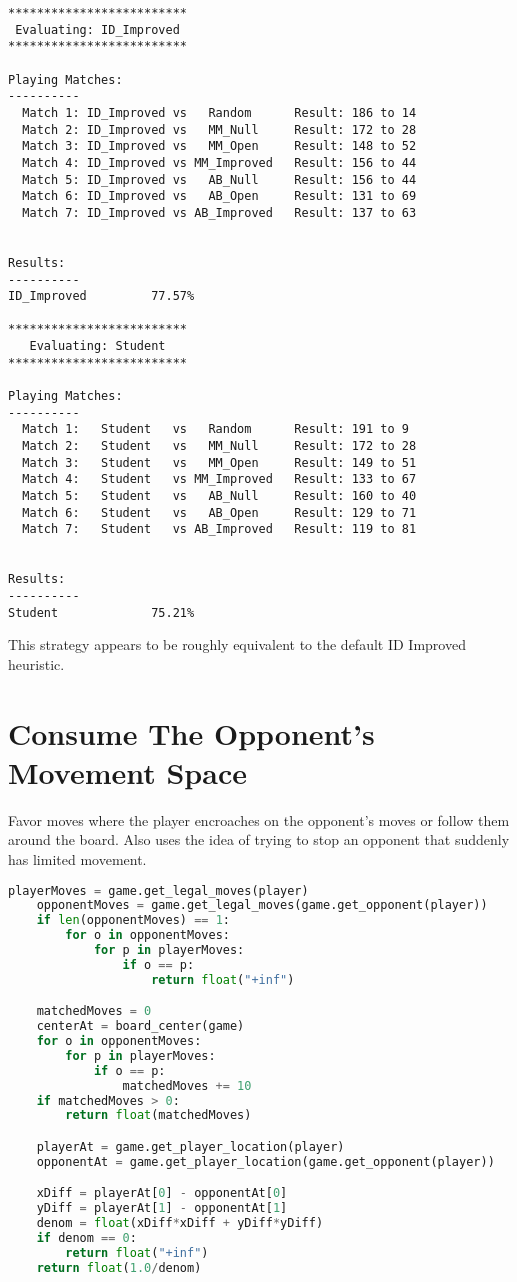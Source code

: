\documentclass[10pt, a4paper]{article}
\begin{document}
\begin{verbatim}
*************************
 Evaluating: ID_Improved 
*************************

Playing Matches:
----------
  Match 1: ID_Improved vs   Random    	Result: 186 to 14
  Match 2: ID_Improved vs   MM_Null   	Result: 172 to 28
  Match 3: ID_Improved vs   MM_Open   	Result: 148 to 52
  Match 4: ID_Improved vs MM_Improved 	Result: 156 to 44
  Match 5: ID_Improved vs   AB_Null   	Result: 156 to 44
  Match 6: ID_Improved vs   AB_Open   	Result: 131 to 69
  Match 7: ID_Improved vs AB_Improved 	Result: 137 to 63


Results:
----------
ID_Improved         77.57%

*************************
   Evaluating: Student   
*************************

Playing Matches:
----------
  Match 1:   Student   vs   Random    	Result: 191 to 9
  Match 2:   Student   vs   MM_Null   	Result: 172 to 28
  Match 3:   Student   vs   MM_Open   	Result: 149 to 51
  Match 4:   Student   vs MM_Improved 	Result: 133 to 67
  Match 5:   Student   vs   AB_Null   	Result: 160 to 40
  Match 6:   Student   vs   AB_Open   	Result: 129 to 71
  Match 7:   Student   vs AB_Improved 	Result: 119 to 81


Results:
----------
Student             75.21%
\end{verbatim}

This strategy appears to be roughly equivalent to the default ID Improved heuristic.

\section{Consume The Opponent's Movement Space}

Favor moves where the player encroaches on the opponent's moves or follow them around
the board. Also uses the idea of trying to stop an opponent that suddenly has limited movement.

\begin{lstlisting}[language=Python]
    playerMoves = game.get_legal_moves(player)
    opponentMoves = game.get_legal_moves(game.get_opponent(player))
    if len(opponentMoves) == 1:
        for o in opponentMoves:
            for p in playerMoves:
                if o == p:
                    return float("+inf")

    matchedMoves = 0
    centerAt = board_center(game)
    for o in opponentMoves:
        for p in playerMoves:
            if o == p:
                matchedMoves += 10
    if matchedMoves > 0:
        return float(matchedMoves)

    playerAt = game.get_player_location(player)
    opponentAt = game.get_player_location(game.get_opponent(player))

    xDiff = playerAt[0] - opponentAt[0]
    yDiff = playerAt[1] - opponentAt[1]
    denom = float(xDiff*xDiff + yDiff*yDiff)
    if denom == 0:
        return float("+inf")
    return float(1.0/denom)
\end{lstlisting}
\end{document}
